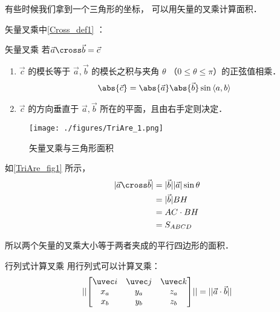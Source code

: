 
\begin{issues}
\issueDraft
\end{issues}


有些时候我们拿到一个三角形的坐标， 可以用矢量的叉乘计算面积．

矢量叉乘中\autoref{Cross_def1} ：
\begin{definition}{矢量叉乘} \label{TriAre_def1}
若$\vec a \cross \vec b = \vec c $
\begin{enumerate}s
\item $\vec c$ 的模长等于 $\vec a, \vec b$ 的模长之积与夹角 $\theta$ （$0 \leqslant \theta \leqslant \pi$）的正弦值相乘．
\begin{equation}\label{TriAre_eq1}
\abs{\vec c}  = \abs{\vec a} \abs{\vec b} \sin\left<a, b \right>
\end{equation}
\item $\vec c$ 的方向垂直于 $\vec a, \vec b$ 所在的平面，且由右手定则决定．
\end{enumerate}
\end{definition}
\begin{figure}[ht]
\centering
\texttt{[image: ./figures/TriAre\_1.png]}
\caption{矢量叉乘与三角形面积} \label{TriAre_fig1}
\end{figure}
如\autoref{TriAre_fig1} 所示，
\begin{equation}
\begin{aligned}
\lvert\vec a \cross \vec b\rvert &= \lvert\vec b\rvert \lvert\vec a\rvert\sin\theta \\
&= \lvert\vec b\rvert BH \\
&= AC \cdot BH \\
&= S_{ABCD}
\end{aligned}
\end{equation}

所以两个矢量的叉乘大小等于两者夹成的平行四边形的面积．
\begin{lemma}{行列式计算叉乘}
用行列式可以计算叉乘：
\begin{equation}
\lvert\lvert \begin{bmatrix}
\uvec i & \uvec j & \uvec k \\
x_a & y_a & z_a\\
x_b & y_b & z_b
\end{bmatrix}\rvert\rvert = \lvert\lvert \vec a \cdot \vec b \rvert\rvert
\end{equation}
\end{lemma}

